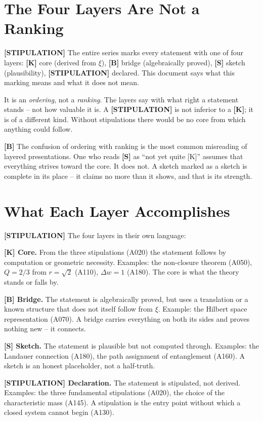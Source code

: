 \section{The Four Layers Are Not a Ranking}

\textbf{[STIPULATION]} The entire series marks every statement with one of four
layers: \textbf{[K]} core (derived from $\xi$), \textbf{[B]} bridge (algebraically
proved), \textbf{[S]} sketch (plausibility), \textbf{[STIPULATION]} declared. This
document says what this marking means and what it does not mean.

It is an \emph{ordering}, not a \emph{ranking}. The layers say with what right a
statement stands -- not how valuable it is. A \textbf{[STIPULATION]} is not
inferior to a \textbf{[K]}; it is of a different kind. Without stipulations there
would be no core from which anything could follow.

\textbf{[B]} The confusion of ordering with ranking is the most common
misreading of layered presentations. One who reads \textbf{[S]} as ``not yet quite
[K]'' assumes that everything strives toward the core. It does not. A sketch
marked as a sketch is complete in its place -- it claims no more than it shows,
and that is its strength.

\section{What Each Layer Accomplishes}

\textbf{[STIPULATION]} The four layers in their own language:

\textbf{[K] Core.} From the three stipulations (A020) the statement follows by
computation or geometric necessity. Examples: the non-closure theorem (A050),
$Q=2/3$ from $r=\sqrt2$ (A110), $\Delta w = 1$ (A180). The core is what the
theory stands or falls by.

\textbf{[B] Bridge.} The statement is algebraically proved, but uses a
translation or a known structure that does not itself follow from $\xi$. Example:
the Hilbert space representation (A070). A bridge carries everything on both its
sides and proves nothing new -- it connects.

\textbf{[S] Sketch.} The statement is plausible but not computed through.
Examples: the Landauer connection (A180), the path assignment of entanglement
(A160). A sketch is an honest placeholder, not a half-truth.

\textbf{[STIPULATION] Declaration.} The statement is stipulated, not derived.
Examples: the three fundamental stipulations (A020), the choice of the
characteristic mass (A145). A stipulation is the entry point without which a
closed system cannot begin (A130).

